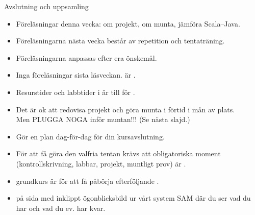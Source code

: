 \begin{SlideExtra}{Avslutning och uppsamling}

\begin{itemize}\SlideFontSmall

\item Föreläsningar denna vecka: om projekt, om munta, jämföra Scala--Java.

\item Föreläsningarna nästa vecka består av repetition och tentaträning.

\item Föreläsningarna anpassas efter era önskemål. %

\item Inga föreläsningar sista läsveckan.  är \LastLectureDate.

\item Resurstider och labbtider i  är till för .
\item Det är ok att redovisa projekt och göra munta i förtid i mån av plats. \\Men PLUGGA NOGA inför muntan!!! (Se nästa slajd.)

\item Gör en  plan dag-för-dag för din kursavslutning.

\item För att få göra den valfria tentan krävs att  obligatoriska moment (kontrollskrivning, labbar, projekt, muntligt prov) är . 

\item {} grundkurs är  för att få påbörja efterföljande .

\item {} på sida med inklippt ögonblicksbild ur vårt system SAM där du ser vad du har  och vad du ev. har kvar.

\end{itemize}

\end{SlideExtra}

